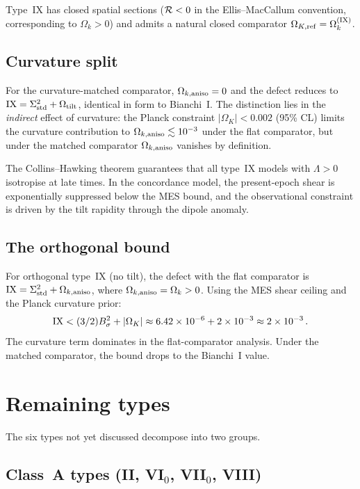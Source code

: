 Type~IX has closed spatial sections ($\mathcal{R} < 0$ in the
Ellis--MacCallum convention, corresponding to $\Omega_k > 0$)
and admits a natural closed comparator
$\Omega_{K,\mathrm{ref}} = \Omega_k^{(\mathrm{IX})}$.


\subsection{Curvature split}

For the curvature-matched comparator, $\Omega_{k,\mathrm{aniso}} = 0$ and the
defect reduces to $\mathrm{IX} = \Sigma^2_{\mathrm{std}} + \Omega_{\mathrm{tilt}}$, identical in
form to Bianchi~I.  The distinction lies in the \emph{indirect}
effect of curvature: the Planck constraint
$|\Omega_K| < 0.002$ (95\% CL) limits the curvature contribution
to $\Omega_{k,\mathrm{aniso}} \lesssim 10^{-3}$ under the flat comparator, but
under the matched comparator $\Omega_{k,\mathrm{aniso}}$ vanishes by definition.

The Collins--Hawking theorem guarantees that all type~IX models
with $\Lambda > 0$ isotropise at late times.  In the concordance
model, the present-epoch shear is exponentially suppressed below
the MES bound, and the observational constraint is driven by the
tilt rapidity through the dipole anomaly.


\subsection{The orthogonal bound}

For orthogonal type~IX (no tilt), the defect with the flat
comparator is $\mathrm{IX} = \Sigma^2_{\mathrm{std}} + \Omega_{k,\mathrm{aniso}}$, where
$\Omega_{k,\mathrm{aniso}} = \Omega_k > 0$.  Using the MES shear ceiling and the
Planck curvature prior:
\begin{equation}
\mathrm{IX} < (3/2)B_\sigma^2 + |\Omega_K|
\approx 6.42 \times 10^{-6} + 2 \times 10^{-3}
\approx 2 \times 10^{-3}\,.
\end{equation}
The curvature term dominates in the flat-comparator analysis.
Under the matched comparator, the bound drops to the
Bianchi~I value.


\section{Remaining types}\label{sec:classAB}

The six types not yet discussed decompose into two groups.

\subsection{Class~A types (II, VI$_0$, VII$_0$, VIII)}

